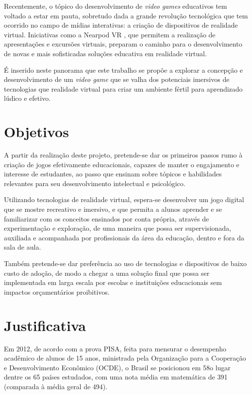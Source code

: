 Recentemente, o tópico do desenvolvimento de 
\textit{video games} educativos tem voltado a estar em 
pauta, sobretudo dada a grande revolução tecnológica 
que tem ocorrido no campo de mídias interativas: a 
criação de dispositivos de realidade virtual. 
Iniciativas como a Nearpod VR \cite{nearpod}, que 
permitem a realização de apresentações e excursões 
virtuais, preparam o caminho para o desenvolvimento 
de novas e mais sofisticadas soluções educativa em 
realidade virtual.

É inserido neste panorama que este trabalho se propõe a 
explorar a concepção e desenvolvimento de um \textit{video game} 
que se valha dos potenciais imersivos de tecnologias que 
realidade virtual para criar um ambiente fértil para 
aprendizado lúdico e efetivo.

\section{Objetivos}\label{sec-objetivos}

A partir da realização deste projeto, pretende-se dar os 
primeiros passos rumo à criação de jogos efetivamente 
educacionais, capazes de manter o engajamento e interesse 
de estudantes, ao passo que ensinam sobre tópicos e 
habilidades relevantes para seu desenvolvimento intelectual 
e psicológico.

Utilizando tecnologias de realidade virtual, espera-se 
desenvolver um jogo digital que se mostre recreativo e 
imersivo, e que permita a alunos aprender e se familiarizar 
com os conceitos ensinados por conta própria, através de 
experimentação e exploração, de uma maneira que possa ser 
supervisionada, auxiliada e acompanhada por profissionais 
da área da educação, dentro e fora da sala de aula.

Também pretende-se dar preferência ao uso de tecnologias 
e dispositivos de baixo custo de adoção, de modo a chegar 
a uma solução final  que possa ser implementada em larga 
escala por escolas e instituições educacionais sem impactos 
orçamentários proibitivos.

\section{Justificativa}\label{sec-justificativas}

Em 2012, de acordo com a prova PISA, feita para mensurar o 
desempenho acadêmico de alunos de 15 anos, ministrada pela 
Organização para a Cooperação e Desenvolvimento Econômico 
(OCDE), o Brasil se posicionou em 58o lugar dentre os 65 
países estudados, com uma nota média em matemática de 391 
(comparada à média geral de 494).

